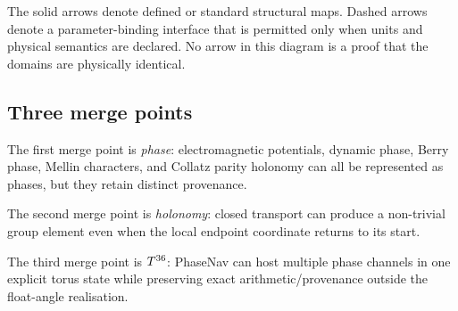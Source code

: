 The solid arrows denote defined or standard structural maps. Dashed arrows denote a parameter-binding interface that is permitted only when units and physical semantics are declared. No arrow in this diagram is a proof that the domains are physically identical.

\subsection{Three merge points}

The first merge point is \emph{phase}: electromagnetic potentials, dynamic phase, Berry phase, Mellin characters, and Collatz parity holonomy can all be represented as phases, but they retain distinct provenance.

The second merge point is \emph{holonomy}: closed transport can produce a non-trivial group element even when the local endpoint coordinate returns to its start.

The third merge point is \(T^{36}\): PhaseNav can host multiple phase channels in one explicit torus state while preserving exact arithmetic/provenance outside the float-angle realisation.
